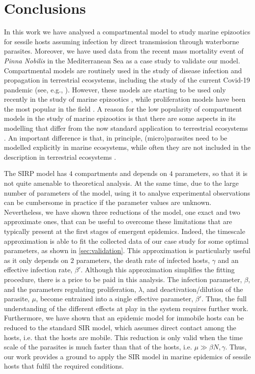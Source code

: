 \section{Conclusions} \label{sec:conclusions}

In this work we have analysed a compartmental model to study marine epizootics
for sessile hosts assuming infection by direct transmission through waterborne
parasites. Moreover, we have used data from the recent mass mortality event of
\textit{Pinna Nobilis} in the Mediterranean Sea as a case study to validate our
model. Compartmental models are routinely used in the study of disease
infection and propagation in terrestrial ecosystems, including the study of the
current Covid-19 pandemic (see, e.g., \cite{Castro2020}). However, these
models are starting to be used only recently in the study of marine epizootics
\cite{article_SIP}, while proliferation models have been the most popular in
the field \cite{Powell2015}. A reason for
the low popularity of compartment models in the study of marine epizootics is
that there are some aspects in its modelling that differ from the now standard
application to terrestrial ecosystems \cite{MCCALLUM_intro}. An important
difference is that, in principle, (micro)parasites need to be modelled
explicitly in marine ecosystems, while often they are not included in the
description in terrestrial ecosystems  \cite{May1979}.

The SIRP model has $4$ compartments and depends on $4$ parameters, so that it
is not quite amenable to theoretical analysis. At the same time, due to the
large number of parameters of the model, using it to analyse experimental
observations can be cumbersome in practice if the parameter values are unknown.
Nevertheless, we have shown three reductions of the model, one exact and two
approximate ones, that can be useful to overcome these limitations that are
typically present at the first stages of emergent epidemics. Indeed, the
timescale approximation is able to fit the collected data of our case study for
some optimal parameters, as shown in \cref{sec:validation}. This approximation
is particularly useful as it only depends on $2$ parameters, the death rate of
infected hosts, $\gamma$ and an effective infection rate, $\beta'$. Although
this approximation simplifies the fitting procedure, there is a price to be
paid in this analysis. The infection parameter, $\beta$, and the parameters
regulating proliferation, $\lambda$, and deactivation/dilution of the parasite,
$\mu$, become entrained into a single effective parameter, $\beta'$. Thus, the
full understanding of the different effects at play in the system requires
further work. Furthermore, we have shown that an epidemic model for immobile
hosts can be reduced to the standard SIR model, which assumes direct contact
among the hosts, i.e. that the hosts are mobile. This reduction is only valid
when the time scale of the parasites is much faster than that of the hosts,
i.e. $\mu\gg\beta N,\gamma$. Thus, our work provides a ground to apply the SIR
model in marine epidemics of sessile hosts that fulfil the required conditions.

